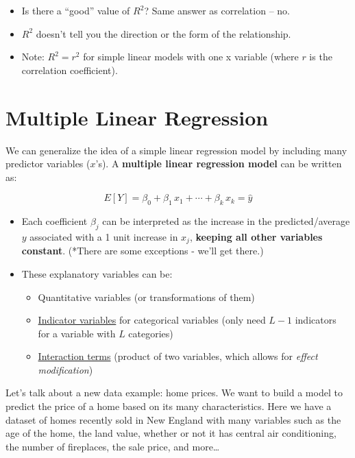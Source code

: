 \documentclass[]{book}
\providecommand{\tightlist}{%
  \setlength{\itemsep}{0pt}\setlength{\parskip}{0pt}}
\begin{document}
\begin{itemize}
\item
  Is there a ``good'' value of \(R^2\)? Same answer as correlation -- no.
\item
  \(R^2\) doesn't tell you the direction or the form of the relationship.
\item
  Note: \(R^2 = r^2\) for simple linear models with one x variable (where \(r\) is the correlation coefficient).
\end{itemize}

\hypertarget{multiple-linear-regression}{%
\section{Multiple Linear Regression}\label{multiple-linear-regression}}

We can generalize the idea of a simple linear regression model by including many predictor variables (\(x\)'s). A \textbf{multiple linear regression model} can be written as:

\[ E[Y] = \beta_0 + \beta_1\,x_{1} + \cdots + \beta_k\,x_{k} = \hat{y} \]

\begin{itemize}
\item
  Each coefficient \(\beta_j\) can be interpreted as the increase in the predicted/average \(y\) associated with a 1 unit increase in \(x_j\), \textbf{keeping all other variables constant}. (*There are some exceptions - we'll get there.)
\item
  These explanatory variables can be:

  \begin{itemize}
  \tightlist
  \item
    Quantitative variables (or transformations of them)
  \item
    \protect\hyperlink{indicator-variables}{Indicator variables} for categorical variables (only need \(L-1\) indicators for a variable with \(L\) categories)
  \item
    \protect\hyperlink{interaction-variables}{Interaction terms} (product of two variables, which allows for \emph{effect modification})
  \end{itemize}
\end{itemize}

Let's talk about a new data example: home prices. We want to build a model to predict the price of a home based on its many characteristics. Here we have a dataset of homes recently sold in New England with many variables such as the age of the home, the land value, whether or not it has central air conditioning, the number of fireplaces, the sale price, and more\ldots{}
\end{document}
